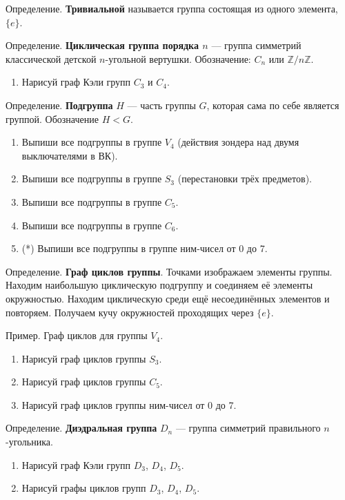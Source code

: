 \documentclass[12pt]{article} %
\def \ZZ{\mathbb{Z}}
\begin{document}
Определение. \textbf{Тривиальной} называется группа состоящая из одного элемента, $\{e\}$.


Определение. \textbf{Циклическая группа порядка $n$} — группа симметрий классической детской $n$-угольной вертушки. Обозначение: $C_n$ или $\ZZ/n\ZZ$.

\begin{enumerate}[resume]
  \item Нарисуй граф Кэли групп $C_3$ и $C_4$.
\end{enumerate}

Определение. \textbf{Подгруппа} $H$ — часть группы $G$, которая сама по себе является группой. Обозначение $H<G$.

\begin{enumerate}[resume]
\item Выпиши все подгруппы в группе $V_4$ (действия зондера над двумя выключателями в ВК).
\item Выпиши все подгруппы в группе $S_3$ (перестановки трёх предметов).
\item Выпиши все подгруппы в группе $C_5$.
\item Выпиши все подгруппы в группе $C_6$.
\item (*) Выпиши все подгруппы в группе ним-чисел от 0 до 7.
\end{enumerate}


Определение. \textbf{Граф циклов группы}. Точками изображаем элементы группы. Находим наибольшую циклическую подгруппу и соединяем её элементы окружностью. Находим циклическую среди ещё несоединённых элементов и повторяем. Получаем кучу окружностей проходящих через $\{e\}$.

Пример. Граф циклов для группы $V_4$.

\begin{enumerate}[resume]
\item Нарисуй граф циклов группы $S_3$.
\item Нарисуй граф циклов группы $C_5$.
\item Нарисуй граф циклов группы ним-чисел от 0 до 7.
\end{enumerate}

Определение. \textbf{Диэдральная группа} $D_n$ — группа симметрий правильного $n$-угольника.

\begin{enumerate}[resume]
\item Нарисуй граф Кэли групп $D_3$, $D_4$, $D_5$.
\item Нарисуй графы циклов групп $D_3$, $D_4$, $D_5$.
\end{enumerate}
\end{document}
